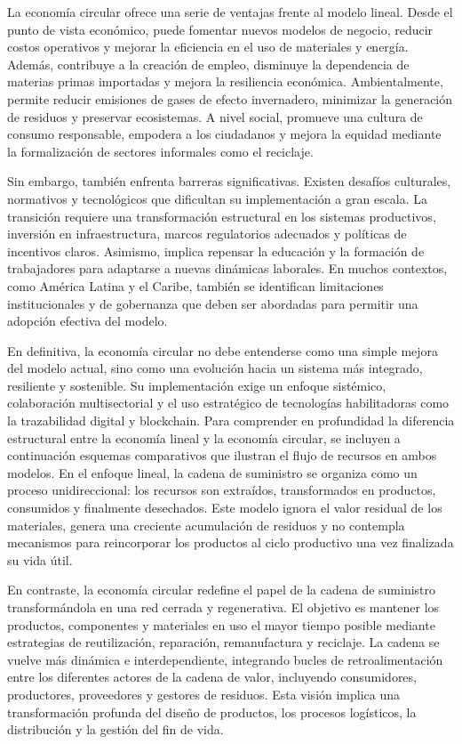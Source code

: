 La economía circular ofrece una serie de ventajas frente al modelo lineal. Desde el punto de vista económico, puede fomentar nuevos modelos de negocio, reducir costos operativos y mejorar la eficiencia en el uso de materiales y energía. Además, contribuye a la creación de empleo, disminuye la dependencia de materias primas importadas y mejora la resiliencia económica. Ambientalmente, permite reducir emisiones de gases de efecto invernadero, minimizar la generación de residuos y preservar ecosistemas. A nivel social, promueve una cultura de consumo responsable, empodera a los ciudadanos y mejora la equidad mediante la formalización de sectores informales como el reciclaje.

Sin embargo, también enfrenta barreras significativas. Existen desafíos culturales, normativos y tecnológicos que dificultan su implementación a gran escala. La transición requiere una transformación estructural en los sistemas productivos, inversión en infraestructura, marcos regulatorios adecuados y políticas de incentivos claros. Asimismo, implica repensar la educación y la formación de trabajadores para adaptarse a nuevas dinámicas laborales. En muchos contextos, como América Latina y el Caribe, también se identifican limitaciones institucionales y de gobernanza que deben ser abordadas para permitir una adopción efectiva del modelo.

En definitiva, la economía circular no debe entenderse como una simple mejora del modelo actual, sino como una evolución hacia un sistema más integrado, resiliente y sostenible. Su implementación exige un enfoque sistémico, colaboración multisectorial y el uso estratégico de tecnologías habilitadoras como la trazabilidad digital y blockchain.
Para comprender en profundidad la diferencia estructural entre la economía lineal y la economía circular, se incluyen a continuación esquemas comparativos que ilustran el flujo de recursos en ambos modelos. En el enfoque lineal, la cadena de suministro se organiza como un proceso unidireccional: los recursos son extraídos, transformados en productos, consumidos y finalmente desechados. Este modelo ignora el valor residual de los materiales, genera una creciente acumulación de residuos y no contempla mecanismos para reincorporar los productos al ciclo productivo una vez finalizada su vida útil.

En contraste, la economía circular redefine el papel de la cadena de suministro transformándola en una red cerrada y regenerativa. El objetivo es mantener los productos, componentes y materiales en uso el mayor tiempo posible mediante estrategias de reutilización, reparación, remanufactura y reciclaje. La cadena se vuelve más dinámica e interdependiente, integrando bucles de retroalimentación entre los diferentes actores de la cadena de valor, incluyendo consumidores, productores, proveedores y gestores de residuos. Esta visión implica una transformación profunda del diseño de productos, los procesos logísticos, la distribución y la gestión del fin de vida.

